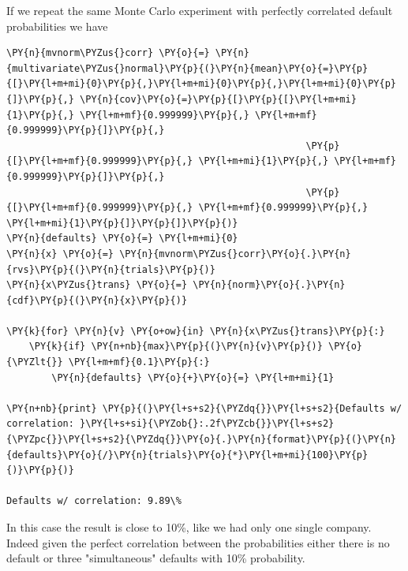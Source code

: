 If we repeat the same Monte Carlo experiment with perfectly correlated
default probabilities we have

\begin{tcolorbox}[breakable, size=fbox, boxrule=1pt, pad at break*=1mm,colback=cellbackground, colframe=cellborder]
\begin{Verbatim}[commandchars=\\\{\}]
\PY{n}{mvnorm\PYZus{}corr} \PY{o}{=} \PY{n}{multivariate\PYZus{}normal}\PY{p}{(}\PY{n}{mean}\PY{o}{=}\PY{p}{[}\PY{l+m+mi}{0}\PY{p}{,}\PY{l+m+mi}{0}\PY{p}{,}\PY{l+m+mi}{0}\PY{p}{]}\PY{p}{,} \PY{n}{cov}\PY{o}{=}\PY{p}{[}\PY{p}{[}\PY{l+m+mi}{1}\PY{p}{,} \PY{l+m+mf}{0.999999}\PY{p}{,} \PY{l+m+mf}{0.999999}\PY{p}{]}\PY{p}{,}
                                                     \PY{p}{[}\PY{l+m+mf}{0.999999}\PY{p}{,} \PY{l+m+mi}{1}\PY{p}{,} \PY{l+m+mf}{0.999999}\PY{p}{]}\PY{p}{,}
                                                     \PY{p}{[}\PY{l+m+mf}{0.999999}\PY{p}{,} \PY{l+m+mf}{0.999999}\PY{p}{,} \PY{l+m+mi}{1}\PY{p}{]}\PY{p}{]}\PY{p}{)}
\PY{n}{defaults} \PY{o}{=} \PY{l+m+mi}{0}
\PY{n}{x} \PY{o}{=} \PY{n}{mvnorm\PYZus{}corr}\PY{o}{.}\PY{n}{rvs}\PY{p}{(}\PY{n}{trials}\PY{p}{)}
\PY{n}{x\PYZus{}trans} \PY{o}{=} \PY{n}{norm}\PY{o}{.}\PY{n}{cdf}\PY{p}{(}\PY{n}{x}\PY{p}{)}

\PY{k}{for} \PY{n}{v} \PY{o+ow}{in} \PY{n}{x\PYZus{}trans}\PY{p}{:}
    \PY{k}{if} \PY{n+nb}{max}\PY{p}{(}\PY{n}{v}\PY{p}{)} \PY{o}{\PYZlt{}} \PY{l+m+mf}{0.1}\PY{p}{:}
        \PY{n}{defaults} \PY{o}{+}\PY{o}{=} \PY{l+m+mi}{1}

\PY{n+nb}{print} \PY{p}{(}\PY{l+s+s2}{\PYZdq{}}\PY{l+s+s2}{Defaults w/ correlation: }\PY{l+s+si}{\PYZob{}:.2f\PYZcb{}}\PY{l+s+s2}{\PYZpc{}}\PY{l+s+s2}{\PYZdq{}}\PY{o}{.}\PY{n}{format}\PY{p}{(}\PY{n}{defaults}\PY{o}{/}\PY{n}{trials}\PY{o}{*}\PY{l+m+mi}{100}\PY{p}{)}\PY{p}{)}

Defaults w/ correlation: 9.89\%
\end{Verbatim}
\end{tcolorbox}
In this case the result is close to 10\%, like we had only one single company. 
Indeed given the perfect correlation between the probabilities either there is no default or three
"simultaneous" defaults with 10\% probability.

